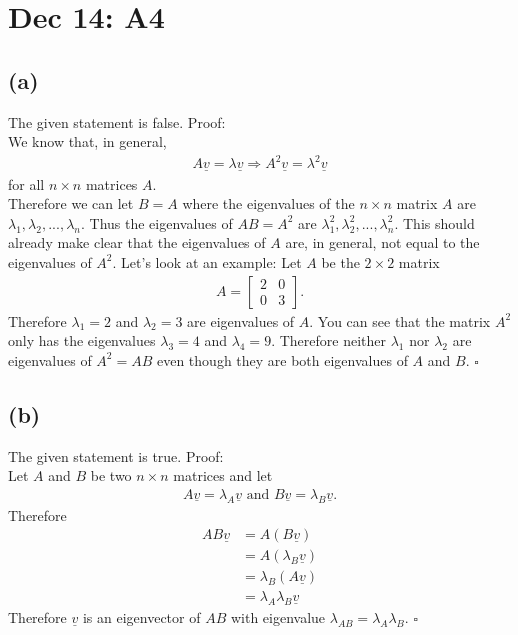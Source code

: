 \documentclass{article}
\renewcommand{\vec}{\underline}
\begin{document}
\section*{Dec 14: A4}
\subsection*{(a)}
The given statement is false. Proof:\\
We know that, in general, 
\begin{align*}
    A\vec v = \lambda\vec v \Rightarrow A^2\vec v = \lambda^2\vec v
\end{align*}
for all $n\times n$ matrices $A$.\\
Therefore we can let $B=A$ where the eigenvalues of the $n\times n$ matrix $A$ are $\lambda_1, \lambda_2, ..., \lambda_n$.
Thus the eigenvalues of $AB=A^2$ are $\lambda_1^2, \lambda_2^2, ..., \lambda_n^2$. This should already make clear that the eigenvalues of $A$ are, in general, not equal to the eigenvalues of $A^2$. Let's look at an example:
Let $A$ be the $2\times2$ matrix
\begin{align*}
    A = \begin{bmatrix}
        2 &0\\ 0& 3
    \end{bmatrix}.
\end{align*}
Therefore $\lambda_1=2$ and $\lambda_2=3$ are eigenvalues of $A$. You can see that the matrix $A^2$ only has the eigenvalues $\lambda_3=4$ and $\lambda_4=9$. Therefore neither $\lambda_1$ nor $\lambda_2$ are eigenvalues of $A^2=AB$ even though they are both eigenvalues of $A$ and $B$. $\square$
\subsection*{(b)}
The given statement is true. Proof:\\
Let $A$ and $B$ be two $n\times n$ matrices and let
\begin{align*}
    A\vec v =\lambda_A \vec v \text{  and  } B\vec v =\lambda_B\vec v.
\end{align*}
Therefore
\begin{align*}
    AB\vec v &= A(B\vec v)\\
    &= A(\lambda_B\vec v)\\
    &= \lambda_B(A\vec v)\\
    &=\lambda_A\lambda_B\vec v
\end{align*}
Therefore $\vec v$ is an eigenvector of $AB$ with eigenvalue $\lambda_{AB}=\lambda_A\lambda_B$. $\square$
\end{document}
